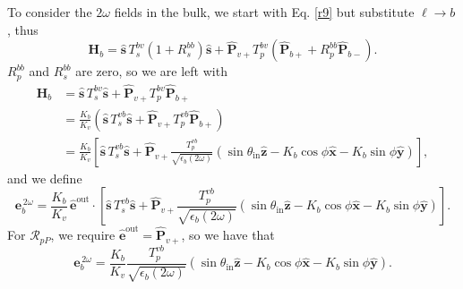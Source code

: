 To consider the $2\omega$ fields in the bulk, we start with Eq. \eqref{r9} but
substitute $\ell\rightarrow b$, thus
\begin{equation*}
\mathbf{H}_{b}
= \hat{\mathbf{s}}\,T_s^{b v}\left(1+R_{s}^{b b}\right)\hat{\mathbf{s}}
+ \hat{\mathbf{P}}_{v+}T_{p}^{b v}
\left(
\hat{\mathbf{P}}_{b+} + R_{p}^{b b}\hat{\mathbf{P}}_{b-}
\right).
\end{equation*}
$R_{p}^{b b}$ and $R_{s}^{b b}$ are zero, so we are left with
\begin{equation*}
\begin{split}
\mathbf{H}_{b}
&= \hat{\mathbf{s}}\,T_s^{b v}\hat{\mathbf{s}}
 + \hat{\mathbf{P}}_{v+}T_{p}^{b v}\hat{\mathbf{P}}_{b+}\\
&= \frac{K_{b}}{K_{v}}\left(\hat{\mathbf{s}}\,T_s^{vb}\hat{\mathbf{s}}
 + \hat{\mathbf{P}}_{v+}T_{p}^{vb}\hat{\mathbf{P}}_{b+}\right)\\
&= \frac{K_{b}}{K_{v}}
   \left[
   \hat{\mathbf{s}}\,T_s^{vb}\hat{\mathbf{s}}
 + \hat{\mathbf{P}}_{v+}
   \frac{T_{p}^{vb}}{\sqrt{\epsilon_{b}(2\omega)}}
   (\sin\theta_{\mathrm{in}}\hat{\mathbf{z}}
 - K_{b}\cos\phi\hat{\mathbf{x}} 
 - K_{b}\sin\phi\hat{\mathbf{y}})
   \right],
\end{split}
\end{equation*}
and we define
\begin{equation*}
\mathbf{e}^{\,2\omega}_{b}
= \frac{K_{b}}{K_{v}}\,\hat{\mathbf{e}}^{\mathrm{out}}\cdot
\left[
   \hat{\mathbf{s}}\,T_s^{vb}\hat{\mathbf{s}}
 + \hat{\mathbf{P}}_{v+}
   \frac{T_{p}^{vb}}{\sqrt{\epsilon_{b}(2\omega)}}
   (\sin\theta_{\mathrm{in}}\hat{\mathbf{z}}
 - K_{b}\cos\phi\hat{\mathbf{x}} 
 - K_{b}\sin\phi\hat{\mathbf{y}})
   \right].
\end{equation*}
For $\mathcal{R}_{pP}$, we require
$\hat{\mathbf{e}}^{\mathrm{out}}=\hat{\mathbf{P}}_{v+}$, so we have that
\begin{equation*}
\mathbf{e}^{\,2\omega}_{b}
= \frac{K_{b}}{K_{v}}
  \frac{T_{p}^{vb}}{\sqrt{\epsilon_{b}(2\omega)}}
  (\sin\theta_{\mathrm{in}}\hat{\mathbf{z}}
- K_{b}\cos\phi\hat{\mathbf{x}} 
- K_{b}\sin\phi\hat{\mathbf{y}}).
\end{equation*}


